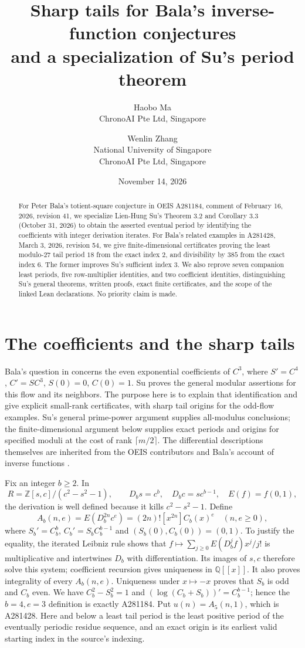 \documentclass[11pt]{article}
\title{Sharp tails for Bala's inverse-function conjectures\\
and a specialization of Su's period theorem}
\author{Haobo Ma\\\small ChronoAI Pte Ltd, Singapore
\and Wenlin Zhang\\\small National University of Singapore\\[-1pt]
\small ChronoAI Pte Ltd, Singapore}
\date{November 14, 2026}
\newcommand{\Z}{\mathbb Z}
\newcommand{\Q}{\mathbb Q}
\begin{document}
\maketitle
\begin{abstract}
For Peter Bala's totient-square conjecture in OEIS A281184, comment of
February 16, 2026, revision 41, we specialize Lien-Hung Su's Theorem 3.2
and Corollary 3.3 (October 31, 2026) to obtain the asserted eventual
period by identifying the coefficients with integer derivation iterates.
For Bala's related examples in A281428, March 3, 2026, revision 54,
we give finite-dimensional certificates proving the least modulo-$27$
tail period $18$ from the exact index $2$, and divisibility by $385$
from the exact index $6$.
The former improves Su's sufficient index $3$.
We also reprove seven companion least periods, five row-multiplier
identities, and two coefficient identities, distinguishing Su's general
theorems, written proofs, exact finite certificates, and the scope of
the linked Lean declarations. No priority claim is made.
\end{abstract}

\section{The coefficients and the sharp tails}
Bala's question in \cite{oeis184} concerns the even exponential
coefficients of $C^3$, where $S'=C^4$, $C'=SC^3$, $S(0)=0$, $C(0)=1$.
Su \cite{su} proves the general modular assertions for this flow and its
neighbors. The purpose here is to explain that identification and give
explicit small-rank certificates, with sharp tail origins for the
odd-flow examples. Su's general prime-power argument supplies all-modulus
conclusions; the finite-dimensional argument below supplies exact periods
and origins for specified moduli at the cost of rank $\lceil m/2\rceil$.
The differential descriptions themselves are inherited from the OEIS
contributors and Bala's account of inverse functions \cite{graves}.

Fix an integer $b\geq2$. In
\[
 R=\Z[s,c]/(c^2-s^2-1),\qquad
 D_b s=c^b,\quad D_b c=sc^{b-1},\quad E(f)=f(0,1),
\]
the derivation is well defined because it kills $c^2-s^2-1$.
Define
\begin{equation}\label{eq:coeff}
 A_b(n,e)=E(D_b^{2n}c^e)=(2n)![x^{2n}]C_b(x)^e
 \quad(n,e\geq0),
\end{equation}
where $S_b'=C_b^b$, $C_b'=S_bC_b^{b-1}$ and $(S_b(0),C_b(0))=(0,1)$.
To justify the equality, the iterated Leibniz rule shows that
$f\mapsto\sum_{j\geq0}E(D_b^jf)x^j/j!$ is multiplicative and intertwines
$D_b$ with differentiation. Its images of $s,c$ therefore solve this
system; coefficient recursion gives uniqueness in $\Q[[x]]$.
It also proves integrality of every $A_b(n,e)$.
Uniqueness under $x\mapsto-x$ proves that $S_b$ is odd and $C_b$ even.
We have $C_b^2-S_b^2=1$ and
$(\log(C_b+S_b))'=C_b^{b-1}$; hence the $b=4,e=3$ definition is
exactly A281184. Put $u(n)=A_5(n,1)$, which is A281428.
Here and below a least tail period is the least positive period of the
eventually periodic residue sequence, and an exact origin is its earliest
valid starting index in the source's indexing.
\end{document}
